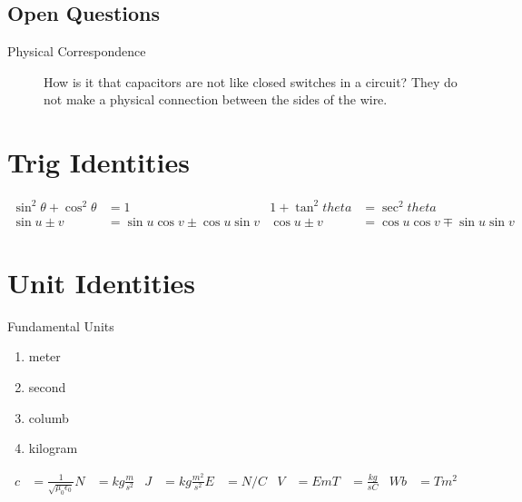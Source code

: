 \documentclass{article}
\begin{document}
   \subsection*{Open Questions}
        \begin{description}
        \item[Physical Correspondence] How is it that capacitors are not like closed switches in a circuit?
        They do not make a physical connection between the sides of the wire.
        \end{description}

\section*{Trig Identities}
    \begin{align*}
        \sin^2{\theta} + \cos^2{\theta} &= 1                 & 1 + \tan^2{theta} &= \sec^2{theta} \\
        \sin{u \pm v} &= \sin{u} \cos{v} \pm \cos{u} \sin{v} & \cos{u \pm v} &= \cos{u} \cos{v} \mp \sin{u} \sin{v}
    \end{align*}

\section*{Unit Identities}
       Fundamental Units
       \begin{enumerate}
       \item meter
       \item second
       \item columb
       \item kilogram
       \end{enumerate}
    \begin{align*}
        c &= \frac{1}{\sqrt{\mu_0 \epsilon_0}}
        N &= kg \frac{m}{s^2} & J &= kg \frac{m^2}{s^2}
        E &= N / C & V &= E m
        T &= \frac{kg}{s C} & Wb &= T m^2 
    \end{align*}
\end{document}
